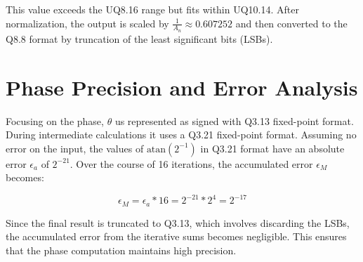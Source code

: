 This value exceeds the UQ8.16 range but fits within UQ10.14. After normalization, the output is scaled by \( \frac{1}{A_n} \approx 0.607252 \) and then converted to the Q8.8 format by truncation of the least significant bits (LSBs).

\section{Phase Precision and Error Analysis}
Focusing on the phase, \( \theta \) us represented as signed with Q3.13 fixed-point format. During intermediate calculations it uses a Q3.21 fixed-point format. Assuming no error on the input, the values of \( \text{atan}(2^{-1}) \) in Q3.21 format have an absolute error \( \epsilon_a \) of \(2^{-21}\). Over the course of 16 iterations, the accumulated error \( \epsilon_M \) becomes:

\[
    \epsilon_M = \epsilon_a * 16 = 2^{-21} * 2^{4} = 2^{-17}
\]

Since the final result is truncated to Q3.13, which involves discarding the LSBs, the accumulated error from the iterative sums becomes negligible. This ensures that the phase computation maintains high precision.